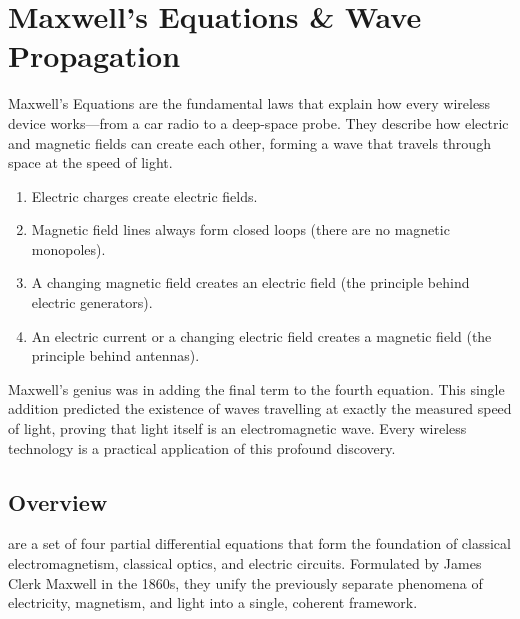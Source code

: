 
\chapter{Maxwell's Equations \& Wave Propagation}
\label{ch:maxwell}

\begin{nontechnical}
    Maxwell's Equations are the fundamental laws that explain how every wireless device works—from a car radio to a deep-space probe. They describe how electric and magnetic fields can create each other, forming a wave that travels through space at the speed of light.

    \begin{enumerate}
        \item Electric charges create electric fields.
        \item Magnetic field lines always form closed loops (there are no magnetic monopoles).
        \item A changing magnetic field creates an electric field (the principle behind electric generators).
        \item An electric current or a changing electric field creates a magnetic field (the principle behind antennas).
    \end{enumerate}

    Maxwell's genius was in adding the final term to the fourth equation. This single addition predicted the existence of waves travelling at exactly the measured speed of light, proving that light itself is an electromagnetic wave. Every wireless technology is a practical application of this profound discovery.
\end{nontechnical}

\section{Overview}

 are a set of four partial differential equations that form the foundation of classical electromagnetism, classical optics, and electric circuits. Formulated by James Clerk Maxwell in the 1860s, they unify the previously separate phenomena of electricity, magnetism, and light into a single, coherent framework.

